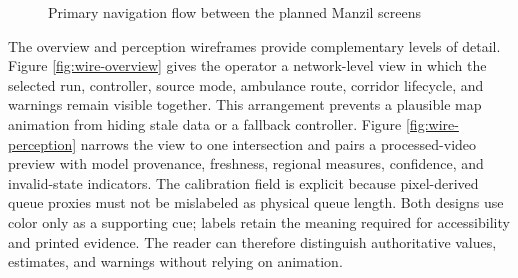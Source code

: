 \begin{figure}[htbp]
\centering
{}
\caption{Primary navigation flow between the planned Manzil screens}
\label{fig:gui-navigation}
\end{figure}

The overview and perception wireframes provide complementary levels of detail. Figure \ref{fig:wire-overview} gives the operator a network-level view in which the selected run, controller, source mode, ambulance route, corridor lifecycle, and warnings remain visible together. This arrangement prevents a plausible map animation from hiding stale data or a fallback controller. Figure \ref{fig:wire-perception} narrows the view to one intersection and pairs a processed-video preview with model provenance, freshness, regional measures, confidence, and invalid-state indicators. The calibration field is explicit because pixel-derived queue proxies must not be mislabeled as physical queue length. Both designs use color only as a supporting cue; labels retain the meaning required for accessibility and printed evidence. The reader can therefore distinguish authoritative values, estimates, and warnings without relying on animation.

